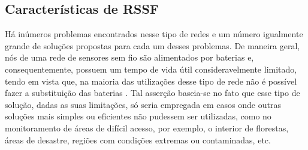 \subsection{Características de RSSF} \label{sec:featuresRSSF}

Há inúmeros problemas encontrados nesse tipo de redes e um número igualmente grande de soluções propostas para cada um desses problemas. De maneira geral, nós de uma rede de sensores sem fio são alimentados por baterias e, consequentemente, possuem um tempo de vida útil consideravelmente limitado, tendo em vista que, na maioria das utilizações desse tipo de rede não é possível fazer a substituição das baterias \cite{Akyildiz2002a}. Tal asserção baseia-se no fato que esse tipo de solução, dadas as suas limitações, só seria empregada em casos onde outras soluções mais simples ou eficientes não pudessem ser utilizadas, como no monitoramento de áreas de difícil acesso, por exemplo, o interior de florestas, áreas de desastre, regiões com condições extremas ou contaminadas, etc. 

